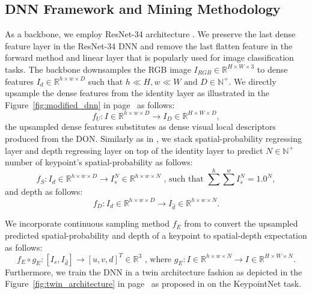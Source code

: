 \subsection{DNN Framework and Mining Methodology}

As a backbone, we employ ResNet-34 architecture \cite{resnet}.
We preserve the last dense feature layer in the ResNet-34 DNN
and remove the last flatten feature in the forward method and linear layer that is popularly used for image classification tasks.
The backbone downsamples the RGB image $I_{RGB} \in \mathbb{R}^{H \times W \times 3}$
to dense features $I_d \in \mathbb{R}^{h \times w \times D}$
such that $ h \ll H, w \ll W \text{ and } D \in \mathbb{N}^+$.
We directly upsample the dense features from the identity layer as illustrated in the Figure~\ref{fig:modified_dnn} in page~\pageref{fig:modified_dnn} as follows:
\begin{equation}
    f_U: I \in \mathbb{R}^{h \times w \times D} \rightarrow I_D \in \mathbb{R}^{H \times W \times D},
\end{equation}
the upsampled dense features substitutes as dense visual local descriptors produced from the DON.
Similarly as in \cite{suwajanakorn2018discovery}, we stack spatial-probability regressing layer and
depth regressing layer on top of the identity layer to predict $N \in \mathbb{N}^+$ number of keypoint's spatial-probability as follows:
\begin{equation}
    f_S: I_d \in \mathbb{R}^{h \times w \times D} \rightarrow I_s^N \in \mathbb{R}^{h \times w \times N} \text{ , such that } \sum^{h} \sum^{w} I_s^N = 1.0^N,
\end{equation}
and depth as follows:
\begin{equation}
    f_D: I_d \in \mathbb{R}^{h \times w \times D} \rightarrow I_{\hat{d}} \in \mathbb{R}^{h \times w \times N}.
\end{equation}

We incorporate continuous sampling method $f_E$ from \parencites{florence2020dense}{suwajanakorn2018discovery}
to convert the upsampled predicted spatial-probability and depth of a keypoint to spatial-depth expectation as follows:
\begin{equation}
    f_E \circ g_E:[I_s, I_{\hat{d}}] \rightarrow [u, v, d]^T \in \mathbb{R}^3 \text{ , where }  g_E: I \in \mathbb{R}^{h \times w \times N} \rightarrow I \in \mathbb{R}^{H \times W \times N}.
\end{equation}
Furthermore, we train the DNN in a twin architecture fashion as depicted in the Figure~\ref{fig:twin_architecture}
in page~\pageref{fig:twin_architecture} as proposed in
\parencites{chen2020simple}{zbontar2021barlow}{florence2018dense}{florence2020dense}{kupcsik2021supervised}{adrian2022efficient}{hadjivelichkov2021fully}{nerf-Supervision}
on the KeypointNet task.

